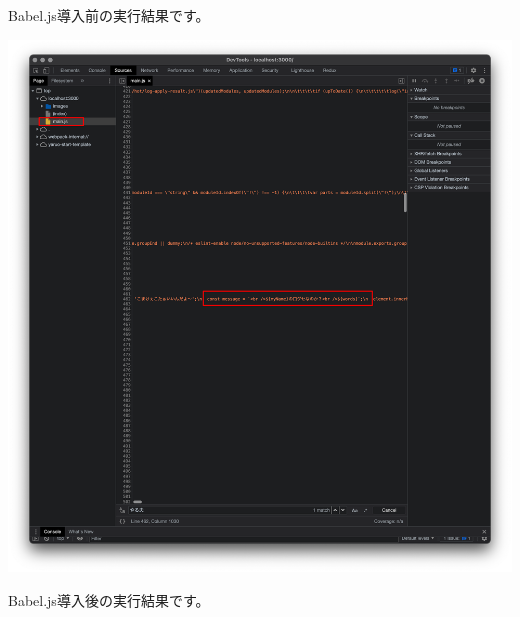 \clearpage


Babel.js導入前の実行結果です。

\begin{reviewimage}%
\includegraphics[width=0.9\maxwidth]{./images/02-create-react-app/babel06.png}%
\label{image:02-create-react-app:babel06}
\end{reviewimage}

\clearpage


Babel.js導入後の実行結果です。

